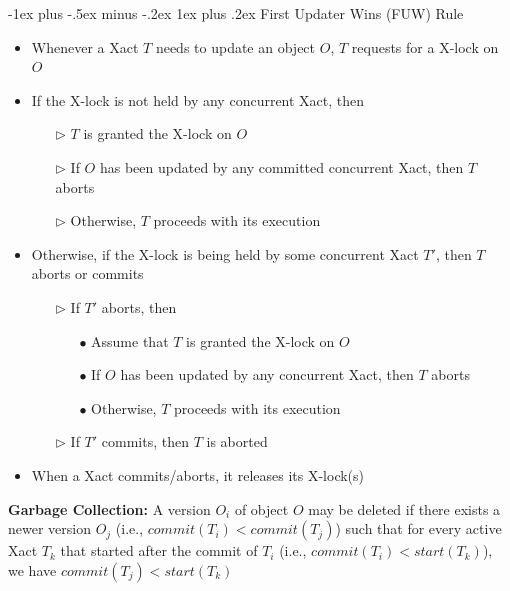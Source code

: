 \documentclass[10pt,landscape]{article}
\makeatletter
\newcommand{\subsubsubsection}{\@startsection{subsubsection}{3}{0mm}%
                                {-1ex plus -.5ex minus -.2ex}%
                                {1ex plus .2ex}%
                                {\normalfont\scriptsize\bfseries}}
\newcommand{\1}{\mathmybb{1}}
\makeatother
\begin{document}
\begin{multicols*}{3}
\subsubsubsection{First Updater Wins (FUW) Rule}
\begin{itemize}
    \item Whenever a Xact $T$ needs to update an object $O$, $T$ requests for a X-lock on $O$
    \item If the X-lock is not held by any concurrent Xact, then
    \begin{itemize}
        \item[$\triangleright$] $T$ is granted the X-lock on $O$
        \item[$\triangleright$] If $O$ has been updated by any committed concurrent Xact, then $T$ aborts
        \item[$\triangleright$] Otherwise, $T$ proceeds with its execution
    \end{itemize}
    \item Otherwise, if the X-lock is being held by some concurrent Xact $T'$, then $T$ aborts or commits
    \begin{itemize}
        \item[$\triangleright$] If $T'$ aborts, then
        \begin{itemize}
            \item[$\bullet$] Assume that $T$ is granted the X-lock on $O$
            \item[$\bullet$] If $O$ has been updated by any concurrent Xact, then $T$ aborts
            \item[$\bullet$] Otherwise, $T$ proceeds with its execution
        \end{itemize}
        \item[$\triangleright$] If $T'$ commits, then $T$ is aborted
    \end{itemize}
    \item When a Xact commits/aborts, it releases its X-lock(s)
\end{itemize}

\textbf{Garbage Collection:}  A version $O_i$ of object $O$ may be deleted if there exists a newer version $O_j$ (i.e., $commit(T_i) < commit(T_j)$) such that for every active Xact $T_k$ that started after the commit of $T_i$ (i.e., $commit(T_i) < start(T_k)$), we have $commit(T_j) < start(T_k)$


\end{multicols*}
\end{document}

